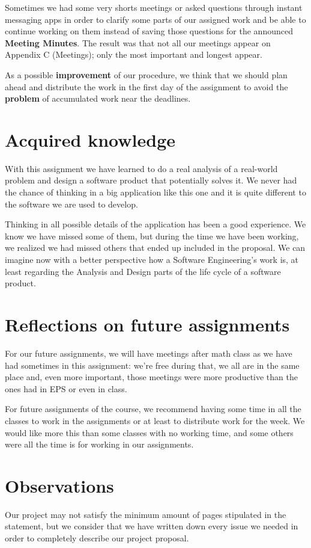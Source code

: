 \documentclass{article}
\begin{document}
Sometimes we had some very shorts meetings or asked questions through instant messaging apps in order to clarify some parts of our assigned work and be able to continue working on them instead of saving those questions for the announced \textbf{Meeting Minutes}. The result was that not all our meetings appear on Appendix C (Meetings); only the most important and longest appear.

As a possible \textbf{improvement} of our procedure, we think that we should plan ahead and distribute the work in the first day of the assignment to avoid the \textbf{problem} of accumulated work near the deadlines.

\section{Acquired knowledge}

With this assignment we have learned to do a real analysis of a real-world problem and design a software product that potentially solves it. We never had the chance of thinking in a big application like this one and it is quite different to the software we are used to develop.

Thinking in all possible details of the application has been a good experience. We know we have missed some of them, but during the time we have been working, we realized we had missed others that ended up included in the proposal. We can imagine now with a better perspective how a Software Engineering's work is, at least regarding the Analysis and Design parts of the life cycle of a software product.

\section{Reflections on future assignments}

For our future assignments, we will have meetings after math class as we have had sometimes in this assignment: we're free during that, we all are in the same place and, even more important, those meetings were more productive than the ones had in EPS or even in class.

For future assignments of the course, we recommend having some time in all the classes to work in the assignments or at least to distribute work for the week. We would like more this than some classes with no working time, and some others were all the time is for working in our assignments.

\section{Observations}

Our project may not satisfy the minimum amount of pages stipulated in the statement, but we consider that we have written down every issue we needed in order to completely describe our project proposal.
\end{document}
